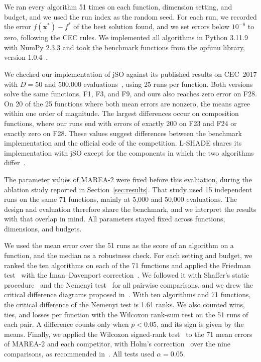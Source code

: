 \documentclass[preprint,12pt]{elsarticle}
\newcommand{\vx}{\mathbf{x}}
\begin{document}
We ran every algorithm 51 times on each function, dimension setting, and
budget, and we used the run index as the random seed. For each run, we recorded
the error $f(\vx^{*}) - f^{*}$ of the best solution found, and we set errors
below $10^{-8}$ to zero, following the CEC rules. We implemented all algorithms
in Python 3.11.9 with NumPy 2.3.3 and took the benchmark functions from the
opfunu library, version 1.0.4~\cite{vanthieu2024opfunu}.

We checked our implementation of jSO against its published results on CEC~2017
with $D = 50$ and 500,000 evaluations~\cite{brest2017jso}, using 25 runs per
function. Both versions solve the same functions, F1, F3, and F9, and ours also
reaches zero error on F28. On 20 of the 25 functions where both mean errors are
nonzero, the means agree within one order of magnitude. The largest differences
occur on composition functions, where our runs end with errors of exactly 200
on F23 and F24 or exactly zero on F28. These values suggest differences between
the benchmark implementation and the official code of the competition.
L-SHADE shares its implementation with jSO except for the components in which
the two algorithms differ~\cite{brest2017jso}.

The parameter values of MAREA-2 were fixed before this evaluation, during the
ablation study reported in Section~\ref{sec:results}. That study used 15
independent runs on the same 71 functions, mainly at 5,000 and 50,000
evaluations. The design and evaluation therefore share the benchmark, and we
interpret the results with that overlap in mind. All parameters stayed fixed across
functions, dimensions, and budgets.

We used the mean error over the 51 runs as the score of an algorithm on a
function, and the median as a robustness check. For each setting and budget,
we ranked the ten algorithms on each of the 71 functions and applied the
Friedman test~\cite{friedman1937ranks} with the Iman--Davenport
correction~\cite{iman1980approximations}. We followed it with Shaffer's static procedure~\cite{shaffer1986modified} and
the Nemenyi test~\cite{nemenyi1963distribution} for all pairwise comparisons,
and we drew the critical difference diagrams proposed
in~\cite{demsar2006statistical}. With ten
algorithms and 71 functions, the critical difference of the Nemenyi test is
1.61 ranks. We also counted wins, ties, and losses per function with the
Wilcoxon rank-sum test on the 51 runs of each pair. A difference counts only
when $p < 0.05$, and its sign is given by the means. Finally, we applied
the Wilcoxon signed-rank test~\cite{wilcoxon1945individual} to the 71 mean
errors of MAREA-2 and each competitor, with Holm's
correction~\cite{holm1979simple} over the nine comparisons, as recommended
in~\cite{derrac2011practical}. All tests used $\alpha = 0.05$.
\end{document}
